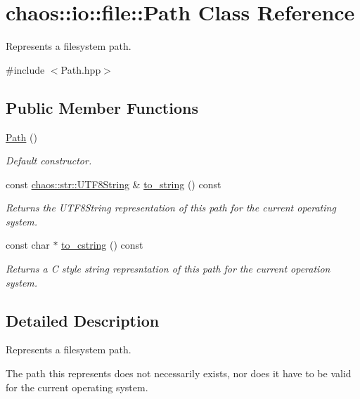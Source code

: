 \hypertarget{classchaos_1_1io_1_1file_1_1_path}{}\section{chaos\+:\+:io\+:\+:file\+:\+:Path Class Reference}
\label{classchaos_1_1io_1_1file_1_1_path}


Represents a filesystem path.  




{\ttfamily \#include $<$Path.\+hpp$>$}

\subsection*{Public Member Functions}
\begin{DoxyCompactItemize}
\item 
\hyperlink{classchaos_1_1io_1_1file_1_1_path_ae221e8dceeedda7ef0376e408a33b388}{Path} ()
\begin{DoxyCompactList}\small\item\em Default constructor. \end{DoxyCompactList}\item 
const \hyperlink{classchaos_1_1str_1_1_u_t_f8_string}{chaos\+::str\+::\+U\+T\+F8\+String} \& \hyperlink{classchaos_1_1io_1_1file_1_1_path_ae4b48bcdce0a4042d21009e4f9ddf884}{to\+\_\+string} () const 
\begin{DoxyCompactList}\small\item\em Returns the U\+T\+F8\+String representation of this path for the current operating system. \end{DoxyCompactList}\item 
const char $\ast$ \hyperlink{classchaos_1_1io_1_1file_1_1_path_a39f5ee90511ee0d4aa8bc6b0396d0cc1}{to\+\_\+cstring} () const 
\begin{DoxyCompactList}\small\item\em Returns a C style string represntation of this path for the current operation system. \end{DoxyCompactList}\end{DoxyCompactItemize}


\subsection{Detailed Description}
Represents a filesystem path. 

The path this represents does not necessarily exists, nor does it have to be valid for the current operating system.

